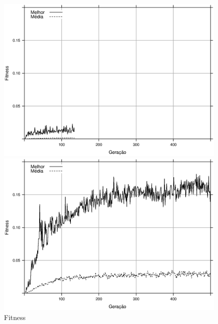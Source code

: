 \begin{figure}[h]
    \begin{minipage}{.5\textwidth}
        \includegraphics[width=\textwidth]{figures/fitness-PSO}
    \end{minipage}%
    \begin{minipage}{.5\textwidth}
        \includegraphics[width=\textwidth]{figures/fitness-PGA}
    \end{minipage}

    \caption{Fitness}
\end{figure}